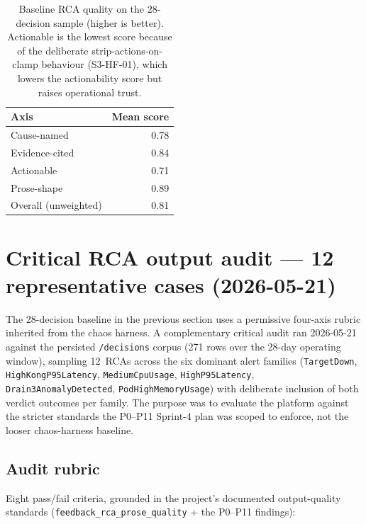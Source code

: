 \documentclass[11pt,a4paper,oneside]{report}
\begin{document}
\begin{table}[h]
\centering
\small
\begin{tabular}{lr}
\toprule
\textbf{Axis} & \textbf{Mean score} \\
\midrule
Cause-named       & 0.78 \\
Evidence-cited    & 0.84 \\
Actionable        & 0.71 \\
Prose-shape       & 0.89 \\
\midrule
Overall (unweighted) & 0.81 \\
\bottomrule
\end{tabular}
\caption{Baseline RCA quality on the 28-decision sample
(higher is better).  Actionable is the lowest score because of the
deliberate strip-actions-on-clamp behaviour (S3-HF-01), which lowers
the actionability score but raises operational trust.}
\label{tab:rca-quality}
\end{table}

\section{Critical RCA output audit --- 12 representative cases (2026-05-21)}
\label{sec:critical-rca-audit}

The 28-decision baseline in the previous section uses a permissive
four-axis rubric inherited from the chaos harness.  A complementary
critical audit ran 2026-05-21 against the persisted
\texttt{/decisions} corpus (271 rows over the 28-day operating
window), sampling 12~RCAs across the six dominant alert families
(\texttt{TargetDown}, \texttt{HighKongP95Latency},
\texttt{MediumCpuUsage}, \texttt{HighP95Latency},
\texttt{Drain3AnomalyDetected}, \texttt{PodHighMemoryUsage}) with
deliberate inclusion of both verdict outcomes per family.  The
purpose was to evaluate the platform against the stricter standards
the P0--P11 Sprint-4 plan was scoped to enforce, not the looser
chaos-harness baseline.

\subsection{Audit rubric}

Eight pass/fail criteria, grounded in the project's documented
output-quality standards
(\texttt{feedback\_rca\_prose\_quality} + the P0--P11
findings):
\end{document}
